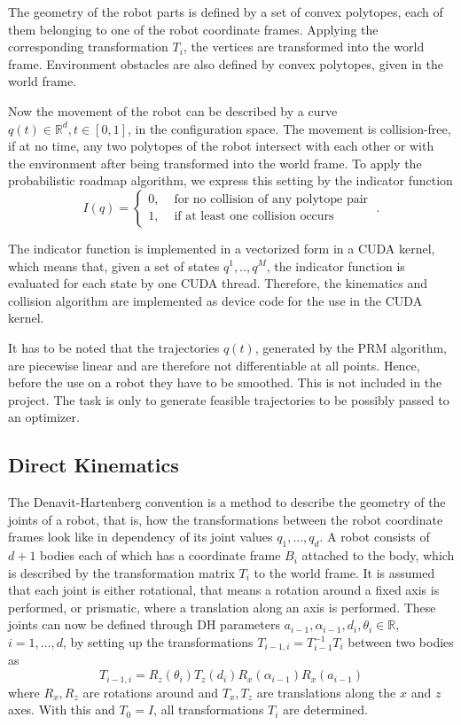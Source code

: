 \documentclass[twocolumn]{svjour3}
\newcommand{\R}{\mathbb{R}}
\begin{document}
The geometry of the robot parts is defined by a set of convex polytopes, each of them belonging to one of the robot coordinate frames. Applying the corresponding transformation $T_i$, the vertices are transformed into the world frame. 
Environment obstacles are also defined by convex polytopes, given in the world frame.

Now the movement of the robot can be described by a curve $q(t) \in \R^d, t\in[0,1]$, in the configuration space. 
The movement is collision-free, if at no time, any two polytopes of the robot intersect with each other or with the environment after being transformed into the world frame.
To apply the probabilistic roadmap algorithm, we express this setting by the indicator function
\begin{equation}
	I(q)=
	\begin{cases}
		0,	& \text{ for no collision of any polytope pair} \\
		1,	& \text{ if at least one collision occurs }
	\end{cases}
	\; .
\end{equation}

The indicator function is implemented in a vectorized form in a CUDA kernel, which means that, given a set of states $q^1,..,q^M$, the indicator function is evaluated for each state by one CUDA thread. 
Therefore, the kinematics and collision algorithm are implemented as device code for the use in the CUDA kernel.

It has to be noted that the trajectories \(q(t)\), generated by the PRM algorithm, are piecewise linear and are therefore not differentiable at all points. 
Hence, before the use on a robot they have to be smoothed. 
This is not included in the project. 
The task is only to generate feasible trajectories to be possibly passed to an optimizer.

\subsection{Direct Kinematics}\label{dk}

The Denavit-Hartenberg convention is a method to describe the geometry of the joints of a robot, 
that is, how the transformations between the robot coordinate frames look like in dependency of its joint values $q_1,...,q_d$.
A robot consists of $d+1$ bodies each of which has a coordinate frame $B_i$ attached to the body, which is described by the transformation matrix $T_i$ to the world frame.
It is assumed that each joint is either rotational, that means a rotation around a fixed axis is performed, 
or prismatic, where a translation along an axis is performed.
These joints can now be defined through DH parameters $a_{i-1}, \alpha_{i-1}, d_i, \theta_i \in \R$, $i=1,...,d$, 
by setting up the transformations $T_{i-1,i}=T_{i-1}^{-1} T_{i}$ between two bodies as
\begin{equation}
	T_{i-1,i} = R_z(\theta_i) T_z(d_i) R_x(\alpha_{i-1}) R_x(a_{i-1})
\end{equation}
where $R_x, R_z$ are rotations aro\-und and $T_x, T_z$ are translations along the $x$ and $z$ axes.
With this and $T_0=I$, all transformations $T_i$ are determined.
\end{document}
